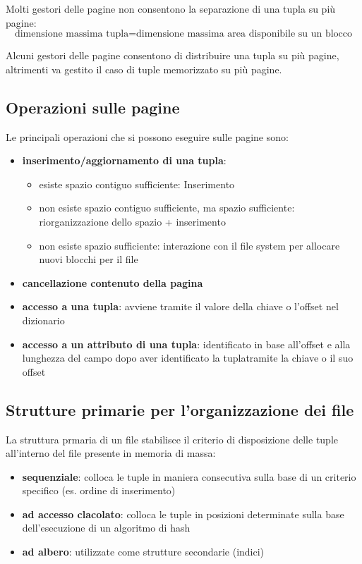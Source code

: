 Molti gestori delle pagine non consentono la separazione di una tupla su più pagine:
\begin{equation*}
  \text{dimensione massima tupla} = \text{dimensione massima area disponibile su un blocco}
\end{equation*}

Alcuni gestori delle pagine consentono di distribuire una tupla su più pagine, altrimenti va gestito il caso di tuple memorizzato su più pagine.

\subsection{Operazioni sulle pagine}
Le principali operazioni che si possono eseguire sulle pagine sono:
\begin{itemize}[label=$\triangleright$, itemsep=\smallskipamount]
  \item \textbf{inserimento/aggiornamento di una tupla}:
  \begin{itemize}[label=$\diamond$, itemsep=\smallskipamount]
    \item esiste spazio contiguo sufficiente: Inserimento
    \item non esiste spazio contiguo sufficiente, ma spazio sufficiente: riorganizzazione dello spazio + inserimento
    \item non esiste spazio sufficiente: interazione con il file system per allocare nuovi blocchi per il file
  \end{itemize}
  \item \textbf{cancellazione contenuto della pagina}
  \item \textbf{accesso a una tupla}: avviene tramite il valore della chiave o l'offset nel dizionario
  \item \textbf{accesso a un attributo di una tupla}: identificato in base all’offset e alla lunghezza del campo dopo aver identificato la tuplatramite la chiave o il suo offset 
\end{itemize}


\subsection{Strutture primarie per l'organizzazione dei file}
La struttura prmaria di un file stabilisce il criterio di disposizione delle tuple all'interno del file presente in memoria di massa:
\begin{itemize}[label=$\triangleright$, itemsep=\smallskipamount]
  \item \textbf{sequenziale}: colloca le tuple in maniera consecutiva sulla base di un criterio specifico (es. ordine di inserimento)
  \item \textbf{ad accesso clacolato}: colloca le tuple in posizioni determinate sulla base dell'esecuzione di un algoritmo di hash
  \item \textbf{ad albero}: utilizzate come strutture secondarie (indici)
\end{itemize}

